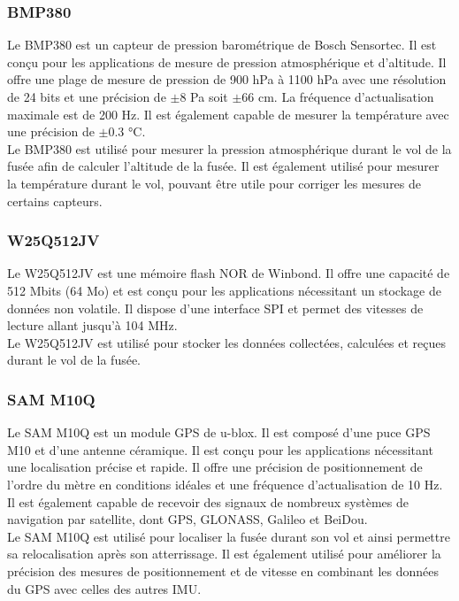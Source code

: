 \documentclass{article}
\begin{document}
\subsubsection{BMP380}

Le BMP380 est un capteur de pression barométrique de Bosch Sensortec. Il est conçu pour
les applications de mesure de pression atmosphérique et d'altitude. Il offre une plage de
mesure de pression de 900 hPa à 1100 hPa avec une résolution de 24 bits et une précision de
$\pm 8$ Pa soit $\pm 66$ cm. La fréquence d'actualisation maximale est de 200 Hz. Il est
également capable de mesurer la température avec une précision de $\pm 0.3$ °C.\\

Le BMP380 est utilisé pour mesurer la pression atmosphérique durant le vol de la fusée afin de
calculer l'altitude de la fusée. Il est également utilisé pour mesurer la température durant le
vol, pouvant être utile pour corriger les mesures de certains capteurs.

\subsubsection{W25Q512JV}

Le W25Q512JV est une mémoire flash NOR de Winbond. Il offre une capacité de 512 Mbits (64 Mo)
et est conçu pour les applications nécessitant un stockage de données non volatile. Il
dispose d'une interface SPI et permet des vitesses de lecture allant jusqu'à 104 MHz.\\

Le W25Q512JV est utilisé pour stocker les données collectées, calculées et reçues durant le vol
de la fusée.

\subsubsection{SAM M10Q}

Le SAM M10Q est un module GPS de u-blox. Il est composé d'une puce GPS M10 et d'une antenne
céramique. Il est conçu pour les applications nécessitant une localisation précise et
rapide. Il offre une précision de positionnement de l'ordre du mètre en conditions idéales et
une fréquence d'actualisation de 10 Hz. Il est également capable de recevoir des signaux
de nombreux systèmes de navigation par satellite, dont GPS, GLONASS, Galileo et BeiDou.\\

Le SAM M10Q est utilisé pour localiser la fusée durant son vol et ainsi permettre sa
relocalisation après son atterrissage. Il est également utilisé pour améliorer la précision
des mesures de positionnement et de vitesse en combinant les données du GPS avec celles
des autres IMU.
\end{document}
